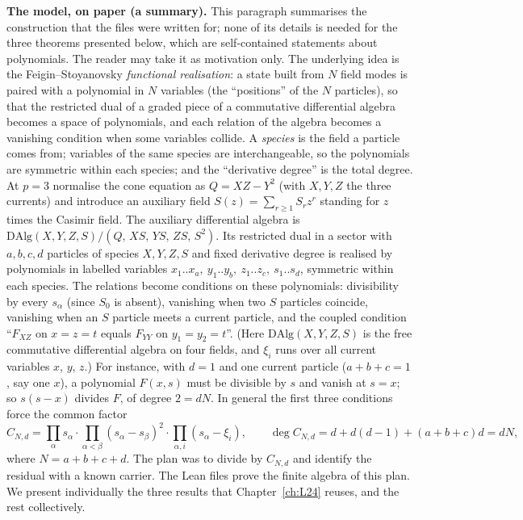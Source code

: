 \textbf{The model, on paper (a summary).} This paragraph summarises the construction that the files were written for; none of its
details is needed for the three theorems presented below, which are self-contained statements about polynomials. The reader may
take it as motivation only. The underlying idea is the Feigin--Stoyanovsky \emph{functional realisation}: a state built from $N$ field
modes is paired with a polynomial in $N$ variables (the ``positions'' of the $N$ particles), so that the restricted dual of a graded
piece of a commutative differential algebra becomes a space of polynomials, and each relation of the algebra becomes a vanishing
condition when some variables collide. A \emph{species} is the field a particle comes from; variables of the same species are
interchangeable, so the polynomials are symmetric within each species; and the ``derivative degree'' is the total degree. At $p=3$ normalise the cone equation as $Q=XZ-Y^2$ (with $X,Y,Z$ the three currents) and introduce an
auxiliary field $S(z)=\sum_{r\ge1}S_rz^r$ standing for $z$ times the Casimir field. The auxiliary differential algebra is
$\mathrm{DAlg}(X,Y,Z,S)/(Q,\,XS,\,YS,\,ZS,\,S^2)$. Its restricted dual in a sector with $a,b,c,d$ particles of species $X,Y,Z,S$ and
fixed derivative degree is realised by polynomials in labelled variables $x_1..x_a,\ y_1..y_b,\ z_1..z_c,\ s_1..s_d$, symmetric within
each species. The relations become conditions on these polynomials: divisibility by every $s_\alpha$ (since $S_0$ is absent), vanishing
when two $S$ particles coincide, vanishing when an $S$ particle meets a current particle, and the coupled condition ``$F_{XZ}$ on $x=z=t$
equals $F_{YY}$ on $y_1=y_2=t$''. (Here $\mathrm{DAlg}(X,Y,Z,S)$ is the free commutative differential algebra on four fields, and $\xi_i$ runs over all current
variables $x$, $y$, $z$.) For instance, with $d=1$ and one current particle ($a+b+c=1$, say one $x$), a polynomial $F(x,s)$ must be
divisible by $s$ and vanish at $s=x$; so $s(s-x)$ divides $F$, of degree $2=dN$. In general the first three conditions force the common
factor
\begin{equation}\label{l20:eq:p3conductor}
C_{N,d}=\prod_\alpha s_\alpha\cdot\prod_{\alpha<\beta}(s_\alpha-s_\beta)^2\cdot\prod_{\alpha,i}(s_\alpha-\xi_i),\qquad
\deg C_{N,d}=d+d(d-1)+(a+b+c)d=dN,
\end{equation}
where $N=a+b+c+d$. The plan was to divide by $C_{N,d}$ and identify the residual with a
known carrier. The Lean files prove the finite algebra of this plan. We present individually the three results that Chapter~\ref{ch:L24}
reuses, and the rest collectively.

